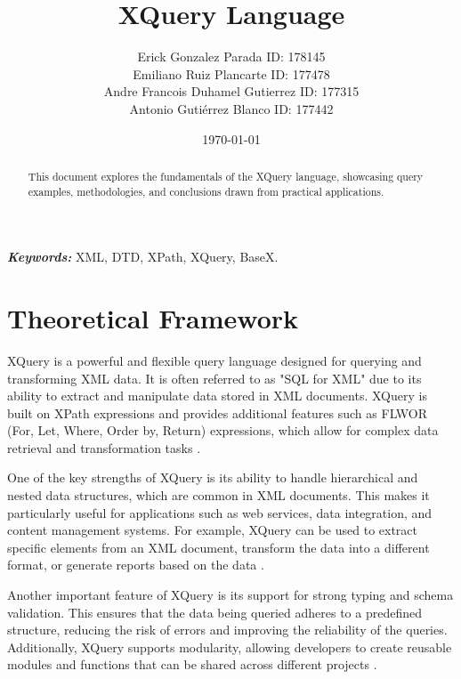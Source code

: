 \documentclass[twoside]{article}
\begin{document}

\title{XQuery Language}
\author{\small{Erick Gonzalez Parada ID: 178145}\\
\small{Emiliano Ruiz Plancarte ID: 177478} \\
\small{Andre Francois Duhamel Gutierrez ID: 177315} \\
\small{Antonio Gutiérrez Blanco ID: 177442}}
\date{\today}
\maketitle

\begin{abstract}
    \raggedright
    This document explores the fundamentals of the XQuery language, showcasing query examples, methodologies, and conclusions drawn from practical applications.
\end{abstract}

\begin{justify}
    \textbf{\textit{Keywords:}} XML, DTD, XPath, XQuery, BaseX.
\end{justify}

\section{Theoretical Framework}
XQuery is a powerful and flexible query language designed for querying and transforming XML data. It is often referred to as "SQL for XML" due to its ability to extract and manipulate data stored in XML documents. XQuery is built on XPath expressions and provides additional features such as FLWOR (For, Let, Where, Order by, Return) expressions, which allow for complex data retrieval and transformation tasks \cite{w3}.

One of the key strengths of XQuery is its ability to handle hierarchical and nested data structures, which are common in XML documents. This makes it particularly useful for applications such as web services, data integration, and content management systems. For example, XQuery can be used to extract specific elements from an XML document, transform the data into a different format, or generate reports based on the data \cite{microsoft}.

Another important feature of XQuery is its support for strong typing and schema validation. This ensures that the data being queried adheres to a predefined structure, reducing the risk of errors and improving the reliability of the queries. Additionally, XQuery supports modularity, allowing developers to create reusable modules and functions that can be shared across different projects \cite{w3schools}.
\end{document}
